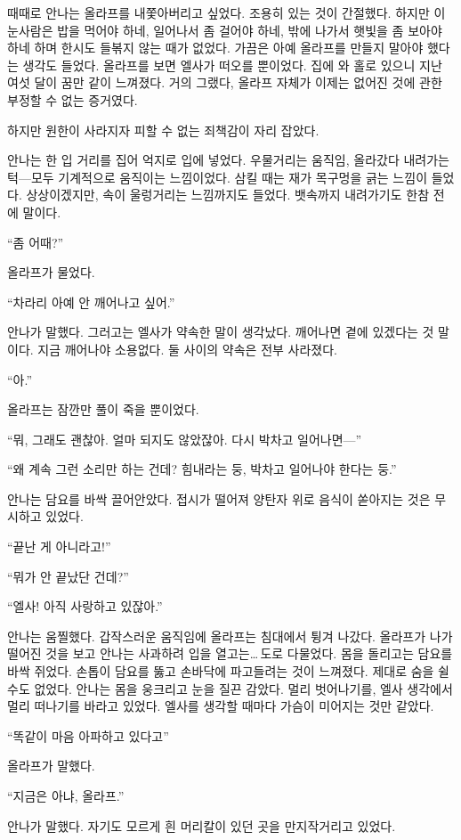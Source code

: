 때때로 안나는 올라프를 내쫓아버리고 싶었다. 조용히 있는 것이 간절했다. 하지만 이 눈사람은 밥을 먹어야 하네, 일어나서 좀 걸어야 하네, 밖에 나가서 햇빛을 좀 보아야 하네 하며 한시도 들볶지 않는 때가 없었다. 가끔은 아예 올라프를 만들지 말아야 했다는 생각도 들었다. 올라프를 보면 엘사가 떠오를 뿐이었다. 집에 와 홀로 있으니 지난 여섯 달이 꿈만 같이 느껴졌다. 거의 그랬다, 올라프 자체가 이제는 없어진 것에 관한 부정할 수 없는 증거였다.

하지만 원한이 사라지자 피할 수 없는 죄책감이 자리 잡았다.

안나는 한 입 거리를 집어 억지로 입에 넣었다. 우물거리는 움직임, 올라갔다 내려가는 턱—모두 기계적으로 움직이는 느낌이었다. 삼킬 때는 재가 목구멍을 긁는 느낌이 들었다. 상상이겠지만, 속이 울렁거리는 느낌까지도 들었다. 뱃속까지 내려가기도 한참 전에 말이다.

``좀 어때?''

올라프가 물었다.

``차라리 아예 안 깨어나고 싶어.''

안나가 말했다. 그러고는 엘사가 약속한 말이 생각났다. 깨어나면 곁에 있겠다는 것 말이다. 지금 깨어나야 소용없다. 둘 사이의 약속은 전부 사라졌다.

``아.''

올라프는 잠깐만 풀이 죽을 뿐이었다.

``뭐, 그래도 괜찮아. 얼마 되지도 않았잖아. 다시 박차고 일어나면—''

``왜 계속 그런 소리만 하는 건데? 힘내라는 둥, 박차고 일어나야 한다는 둥.''

안나는 담요를 바싹 끌어안았다. 접시가 떨어져 양탄자 위로 음식이 쏟아지는 것은 무시하고 있었다.

``끝난 게 아니라고!''

``뭐가 안 끝났단 건데?''

``엘사! 아직 사랑하고 있잖아.''

안나는 움찔했다. 갑작스러운 움직임에 올라프는 침대에서 튕겨 나갔다. 올라프가 나가떨어진 것을 보고 안나는 사과하려 입을 열고는\ldots\,도로 다물었다. 몸을 돌리고는 담요를 바싹 쥐었다. 손톱이 담요를 뚫고 손바닥에 파고들려는 것이 느껴졌다. 제대로 숨을 쉴 수도 없었다. 안나는 몸을 웅크리고 눈을 질끈 감았다. 멀리 벗어나기를, 엘사 생각에서 멀리 떠나기를 바라고 있었다. 엘사를 생각할 때마다 가슴이 미어지는 것만 같았다.

``똑같이 마음 아파하고 있다고''

올라프가 말했다.

``지금은 아냐, 올라프.''

안나가 말했다. 자기도 모르게 흰 머리칼이 있던 곳을 만지작거리고 있었다.

